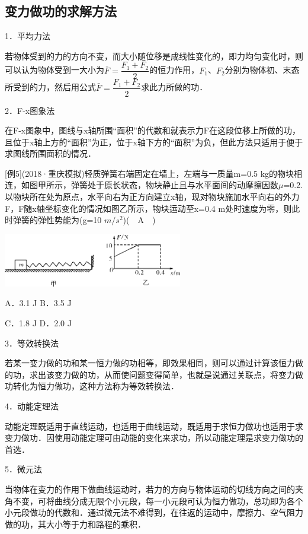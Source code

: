 \documentclass[cn,10.5pt,chinese,mac,chinesefont=founder]{elegantbook}
\begin{document}
\subsection{变力做功的求解方法}

1．平均力法

若物体受到的力的方向不变，而大小随位移是成线性变化的，即力均匀变化时，则可以认为物体受到一大小为$\bar{F}=\dfrac{F_{1}+F_{2}}{2}$的恒力作用，$F_1$、$F_2$分别为物体初、末态所受到的力，然后用公式$\bar{F}=\dfrac{F_{1}+F_{2}}{2}$求此力所做的功．



2．F-x图象法

在F-x图象中，图线与x轴所围``面积''的代数和就表示力F在这段位移上所做的功，且位于x轴上方的``面积''为正，位于x轴下方的``面积''为负，但此方法只适用于便于求图线所围面积的情况．

{[}例5{]}(2018·重庆模拟)轻质弹簧右端固定在墙上，左端与一质量m=0.5
kg的物块相连，如图甲所示，弹簧处于原长状态，物块静止且与水平面间的动摩擦因数$\mu$=0.2.以物块所在处为原点，水平向右为正方向建立x轴，现对物块施加水平向右的外力F，F随x轴坐标变化的情况如图乙所示，物块运动至x=0.4
m处时速度为零，则此时弹簧的弹性势能为(g=10 $m/s^2$)(　A　)

\begin{center}\includegraphics[width=3.08333in,height=0.91667in]{media/image213.png}\end{center}

A．3.1 J B．3.5 J

C．1.8 J D．2.0 J

3．等效转换法

若某一变力做的功和某一恒力做的功相等，即效果相同，则可以通过计算该恒力做的功，求出该变力做的功，从而使问题变得简单，也就是说通过关联点，将变力做功转化为恒力做功，这种方法称为等效转换法．


4．动能定理法

动能定理既适用于直线运动，也适用于曲线运动，既适用于求恒力做功也适用于求变力做功．因使用动能定理可由动能的变化来求功，所以动能定理是求变力做功的首选．



5．微元法

当物体在变力的作用下做曲线运动时，若力的方向与物体运动的切线方向之间的夹角不变，可将曲线分成无限个小元段，每一小元段可认为恒力做功，总功即为各个小元段做功的代数和．通过微元法不难得到，在往返的运动中，摩擦力、空气阻力做的功，其大小等于力和路程的乘积．
\end{document}

